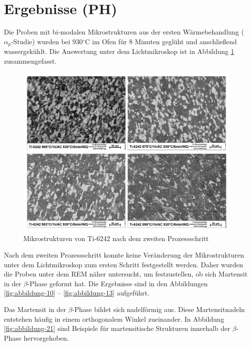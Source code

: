 \section{Ergebnisse (PH)}

Die Proben mit bi-modalen Mikrostrukturen aus der ersten Wärmebehandlung ($\alpha_p$-Studie) wurden bei 930$^\circ$C im Ofen für 8 Minuten geglüht und anschließend wassergekühlt. Die Auswertung unter dem Lichtmikroskop ist in Abbildung \ref{fig:abbildung-9} zusammengefasst.

\begin{figure}[h]
	\centering
	\includegraphics[width=0.9\linewidth]{./Bilder/Abbildung 9.png}
	\caption[Abbildung 9]{Mikrostrukturen von Ti-6242 nach dem zweiten Prozessschritt}
	\label{fig:abbildung-9}
\end{figure}

Nach dem zweiten Prozessschritt konnte keine Veränderung der Mikrostrukturen unter dem Lichtmikroskop zum ersten Schritt festgestellt werden. Daher wurden die Proben unter dem REM näher untersucht, um festzustellen, ob sich Martensit in der $\beta$-Phase geformt hat. Die Ergebnisse sind in den Abbildungen \ref{fig:abbildung-10} -- \ref{fig:abbildung-13} aufgeführt. 

Das Martensit in der $\beta$-Phase bildet sich nadelförmig aus. Diese Martensitnadeln entstehen häufig in einem orthogonalem Winkel zueinander. In Abbildung \ref{fig:abbildung-21} sind Beispiele für martensitische Strukturen innerhalb der $\beta$-Phase hervorgehoben.

